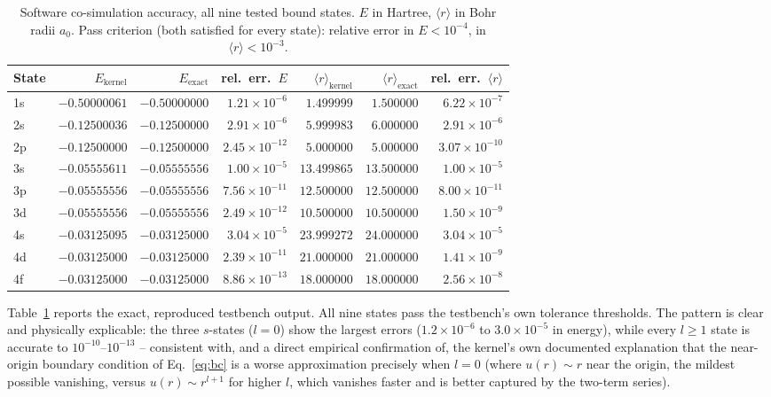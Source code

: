 \documentclass[pdflatex,sn-mathphys,Numbered]{sn-jnl}
\begin{document}
\begin{table}[t]
\centering
\caption{Software co-simulation accuracy, all nine tested bound states. $E$ in Hartree, $\langle r\rangle$ in Bohr radii $a_0$. Pass criterion (both satisfied for every state): relative error in $E<10^{-4}$, in $\langle r\rangle<10^{-3}$.}
\label{tab:accuracy}
\begin{tabular}{@{}lrrrrrr@{}}
\toprule
State & $E_{\text{kernel}}$ & $E_{\text{exact}}$ & rel.\ err.\ $E$ & $\langle r\rangle_{\text{kernel}}$ & $\langle r\rangle_{\text{exact}}$ & rel.\ err.\ $\langle r\rangle$ \\
\midrule
1s & $-0.50000061$ & $-0.50000000$ & $1.21\times10^{-6}$ & $1.499999$ & $1.500000$ & $6.22\times10^{-7}$ \\
2s & $-0.12500036$ & $-0.12500000$ & $2.91\times10^{-6}$ & $5.999983$ & $6.000000$ & $2.91\times10^{-6}$ \\
2p & $-0.12500000$ & $-0.12500000$ & $2.45\times10^{-12}$ & $5.000000$ & $5.000000$ & $3.07\times10^{-10}$ \\
3s & $-0.05555611$ & $-0.05555556$ & $1.00\times10^{-5}$ & $13.499865$ & $13.500000$ & $1.00\times10^{-5}$ \\
3p & $-0.05555556$ & $-0.05555556$ & $7.56\times10^{-11}$ & $12.500000$ & $12.500000$ & $8.00\times10^{-11}$ \\
3d & $-0.05555556$ & $-0.05555556$ & $2.49\times10^{-12}$ & $10.500000$ & $10.500000$ & $1.50\times10^{-9}$ \\
4s & $-0.03125095$ & $-0.03125000$ & $3.04\times10^{-5}$ & $23.999272$ & $24.000000$ & $3.04\times10^{-5}$ \\
4d & $-0.03125000$ & $-0.03125000$ & $2.39\times10^{-11}$ & $21.000000$ & $21.000000$ & $1.41\times10^{-9}$ \\
4f & $-0.03125000$ & $-0.03125000$ & $8.86\times10^{-13}$ & $18.000000$ & $18.000000$ & $2.56\times10^{-8}$ \\
\bottomrule
\end{tabular}
\end{table}

Table~\ref{tab:accuracy} reports the exact, reproduced testbench output. All nine states pass the testbench's own tolerance thresholds. The pattern is clear and physically explicable: the three $s$-states ($l=0$) show the largest errors ($1.2\times10^{-6}$ to $3.0\times10^{-5}$ in energy), while every $l\ge1$ state is accurate to $10^{-10}$--$10^{-13}$ -- consistent with, and a direct empirical confirmation of, the kernel's own documented explanation that the near-origin boundary condition of Eq.~\eqref{eq:bc} is a worse approximation precisely when $l=0$ (where $u(r)\sim r$ near the origin, the mildest possible vanishing, versus $u(r)\sim r^{l+1}$ for higher $l$, which vanishes faster and is better captured by the two-term series).
\end{document}
